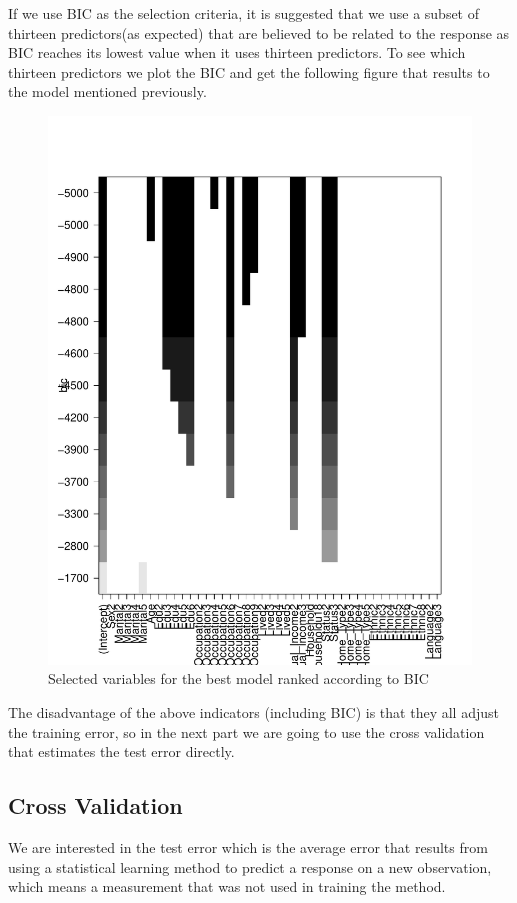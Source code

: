 \documentclass[11pt]{article}
\begin{document}
If we use BIC as the selection criteria, it is suggested that we use a subset of thirteen predictors(as expected) that are believed to be related to the response as BIC reaches its lowest value when it uses thirteen predictors. To see which thirteen predictors we plot the BIC and get the following figure that results to the model mentioned previously.
\begin{figure}[h]
    \centering
   \includegraphics[scale=0.3]{BIC_PLOT.pdf}
    \caption{Selected variables for the best model ranked according to BIC}
    \label{fig:Selected variables for the best model ranked according to BIC}
\end{figure}


The disadvantage of the above indicators (including BIC) is that they all adjust the training error, so in the next part we are going to use the cross validation that estimates the test error directly.

\subsection{Cross Validation}
We are interested in the test error which is the average error that results from using a statistical learning method to predict a response on a new observation, which means a measurement that was not used in training the method. 
\end{document}
